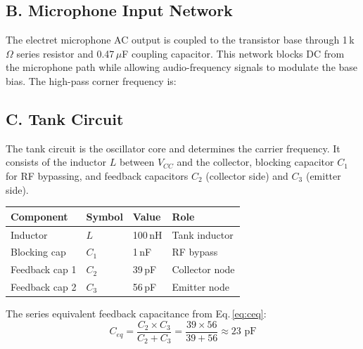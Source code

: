 \documentclass[10pt, twocolumn]{article}
\begin{document}
\subsection{B. Microphone Input Network}

The electret microphone AC output is coupled to the transistor base through
1\,k$\Omega$ series resistor and 0.47\,$\mu$F coupling capacitor. This network
blocks DC from the microphone path while allowing audio-frequency signals to
modulate the base bias. The high-pass corner frequency is:



\subsection{C. Tank Circuit}

The tank circuit is the oscillator core and determines the carrier frequency.
It consists of the inductor $L$ between $V_{CC}$ and the collector, blocking
capacitor $C_1$ for RF bypassing, and feedback capacitors $C_2$ (collector
side) and $C_3$ (emitter side).

\begin{center}
\begin{tabular}{llll}
  \toprule
  Component & Symbol & Value & Role \\
  \midrule
  Inductor       & $L$   & 100\,nH  & Tank inductor \\
  Blocking cap   & $C_1$ & 1\,nF    & RF bypass \\
  Feedback cap 1 & $C_2$ & 39\,pF   & Collector node \\
  Feedback cap 2 & $C_3$ & 56\,pF   & Emitter node \\
  \bottomrule
\end{tabular}
\end{center}

The series equivalent feedback capacitance from Eq.\,\ref{eq:ceq}:
\begin{equation}
  C_{eq} = \frac{C_2 \times C_3}{C_2 + C_3}
          = \frac{39 \times 56}{39 + 56}
          \approx 23\text{ pF}
\end{equation}
\end{document}
